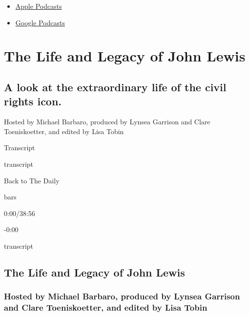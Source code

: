 \begin{itemize}
\tightlist
\item
  \href{https://itunes.apple.com/us/podcast/id1200361736}{Apple
  Podcasts}
\item
  \href{https://www.google.com/podcasts?feed=aHR0cHM6Ly9yc3MuYXJ0MTkuY29tL3RoZS1kYWlseQ\%3D\%3D}{Google
  Podcasts}
\end{itemize}

\hypertarget{the-life-and-legacy-of-john-lewis-1}{%
\section{The Life and Legacy of John
Lewis}\label{the-life-and-legacy-of-john-lewis-1}}

\hypertarget{a-look-at-the-extraordinary-life-of-the-civil-rights-icon-1}{%
\subsection{A look at the extraordinary life of the civil rights
icon.}\label{a-look-at-the-extraordinary-life-of-the-civil-rights-icon-1}}

Hosted by Michael Barbaro, produced by Lynsea Garrison and Clare
Toeniskoetter, and edited by Lisa Tobin

Transcript

transcript

Back to The Daily

bars

0:00/38:56

-0:00

transcript

\hypertarget{the-life-and-legacy-of-john-lewis-2}{%
\subsection{The Life and Legacy of John
Lewis}\label{the-life-and-legacy-of-john-lewis-2}}

\hypertarget{hosted-by-michael-barbaro-produced-by-lynsea-garrison-and-clare-toeniskoetter-and-edited-by-lisa-tobin-1}{%
\subsubsection{Hosted by Michael Barbaro, produced by Lynsea Garrison
and Clare Toeniskoetter, and edited by Lisa
Tobin}\label{hosted-by-michael-barbaro-produced-by-lynsea-garrison-and-clare-toeniskoetter-and-edited-by-lisa-tobin-1}}


